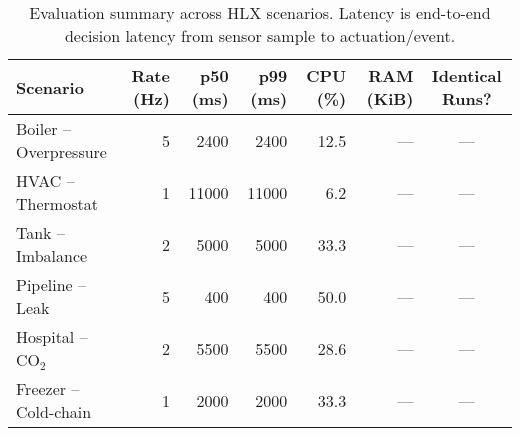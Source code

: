 \begin{table}[t]
\centering
\caption{Evaluation summary across HLX scenarios. Latency is end-to-end decision latency from sensor sample to actuation/event.}
\label{tab:scenarios}
\begin{tabular}{lrrrrrc}
\hline
\textbf{Scenario} & \textbf{Rate (Hz)} & \textbf{p50 (ms)} & \textbf{p99 (ms)} & \textbf{CPU (\%)} & \textbf{RAM (KiB)} & \textbf{Identical Runs?} \\
\hline
Boiler -- Overpressure & 5 & 2400 & 2400 & 12.5 & --- & --- \\
HVAC -- Thermostat     & 1 & 11000 & 11000 & 6.2 & --- & --- \\
Tank -- Imbalance      & 2 & 5000 & 5000 & 33.3 & --- & --- \\
Pipeline -- Leak       & 5 & 400 & 400 & 50.0 & --- & --- \\
Hospital -- CO$_2$     & 2 & 5500 & 5500 & 28.6 & --- & --- \\
Freezer -- Cold-chain  & 1 & 2000 & 2000 & 33.3 & --- & --- \\
\hline
\end{tabular}
\end{table}
